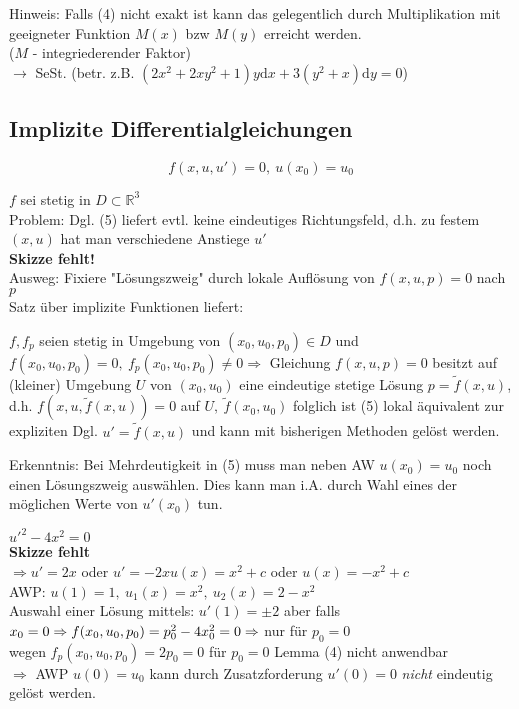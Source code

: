 Hinweis: Falls (4) nicht exakt ist kann das gelegentlich
durch Multiplikation mit geeigneter Funktion $M(x)$ bzw $M(y)$ erreicht werden.\\
($M$ - integriederender Faktor)\\
$\rightarrow $ SeSt. (betr. z.B. $(2 x^2 + 2 xy^2 + 1)y \mathrm{d}x +
3(y^2 + x)  \mathrm{d}y = 0 $)

\subsection{Implizite Differentialgleichungen}
\begin{equation}
f(x,u,u') = 0, \ u(x_0) = u_0
\end{equation}

$f$ sei stetig in $D \subset \mathbb{R}^3 $\\
Problem: Dgl. (5) liefert evtl. keine eindeutiges Richtungsfeld, d.h. zu festem $(x,u)$
hat man verschiedene Anstiege $u'$\\
\textbf{Skizze fehlt!}\\
Ausweg: Fixiere "Lösungszweig" durch lokale Auflösung von $f(x,u,p) = 0 $ nach $p$\\
Satz über implizite Funktionen liefert:

\begin{lemma}
$f, f_p$ seien stetig in Umgebung von $(x_0, u_0, p_0) \in D $ und 
$f(x_0, u_0, p_0) = 0, \ f_p(x_0, u_0, p_0) \neq 0
\Rightarrow $ Gleichung $f(x, u, p) = 0 $ 
besitzt auf (kleiner) Umgebung $U$ von $(x_0, u_0) $
eine eindeutige stetige Lösung $p = \tilde{f}(x,u) $, d.h.
$f(x, u, \tilde{f}(x, u)) = 0 $ auf $U, \ \tilde{f}(x_0, u_0)$
folglich ist (5) lokal äquivalent zur expliziten Dgl. $u' = \tilde{f}(x,u) $
und kann mit bisherigen Methoden gelöst werden.

\end{lemma}

Erkenntnis: Bei Mehrdeutigkeit in (5) muss man neben AW
$u(x_0) = u_0 $ noch einen Lösungszweig auswählen.
Dies kann man i.A. durch Wahl eines der möglichen Werte von $u'(x_0) $ tun.

\begin{beispiel*}
$u'^2 - 4 x^2 = 0 $\\
\textbf{Skizze fehlt}\\
$\Rightarrow u' = 2x $ oder $u' = -2x
u(x) = x^2 + c $ oder $u(x) = -x^2 + c $\\
AWP: $u(1) = 1, \ u_1(x) = x^2, \ u_2(x) = 2 - x^2 $\\
Auswahl einer Lösung mittels:
$u'(1) = \pm 2 $
aber falls $x_0 = 0 \\
\Rightarrow f(x_0, u_0, p_0) = p_0^2 - 4 x_0^2 = 0 \Rightarrow $
nur für $p_0 = 0 $\\
wegen $f_p(x_0, u_0, p_0) = 2p_0 = 0 $ für $p_0 = 0$ Lemma (4) nicht anwendbar \\
$\Rightarrow $ AWP $u(0) = u_0 $ kann durch Zusatzforderung $u'(0) = 0 $
\emph{nicht} eindeutig gelöst werden.

\end{beispiel*}

